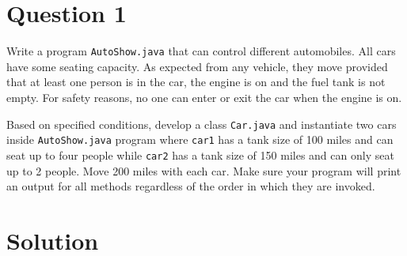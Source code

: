 \documentclass[12pt,letterpaper,twoside]{article}
\begin{document}


\section*{Question 1}

Write a program \texttt{AutoShow.java} that can control different automobiles. All cars have some seating capacity. As expected from any vehicle, they move provided that at least one person is in the car, the engine is on and the fuel tank is not empty. For safety reasons, no one can enter or exit the car when the engine is on.

Based on specified conditions, develop a class \texttt{Car.java} and instantiate two cars inside \texttt{AutoShow.java} program where \texttt{car1} has a tank size of 100 miles and can seat up to four people while \texttt{car2} has a tank size of 150 miles and can only seat up to 2 people. Move 200 miles with each car. Make sure your program will print an output for all methods regardless of the order in which they are invoked.

\section*{Solution}
\end{document}
